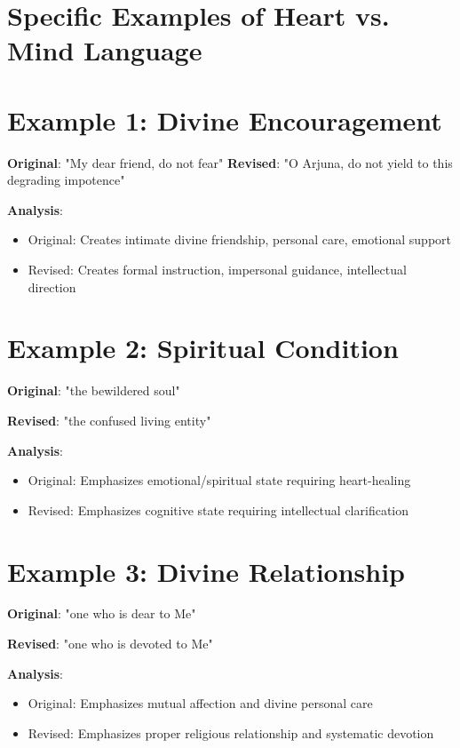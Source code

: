 \documentclass[11pt,twoside]{book}
\begin{document}
\section*{Specific Examples of Heart vs. Mind Language}
\label{sec:org4640902}

\section*{Example 1: Divine Encouragement}
\label{sec:org0e43ae0}
\textbf{\textbf{Original}}: "My dear friend, do not fear"
\textbf{\textbf{Revised}}: "O Arjuna, do not yield to this degrading impotence"

\textbf{\textbf{Analysis}}: 
\begin{itemize}
\item Original: Creates intimate divine friendship, personal care, emotional support
\item Revised: Creates formal instruction, impersonal guidance, intellectual direction
\end{itemize}
\section*{Example 2: Spiritual Condition}
\label{sec:orgf591511}
\textbf{\textbf{Original}}: "the bewildered soul"

\textbf{\textbf{Revised}}: "the confused living entity"

\textbf{\textbf{Analysis}}:
\begin{itemize}
\item Original: Emphasizes emotional/spiritual state requiring heart-healing
\item Revised: Emphasizes cognitive state requiring intellectual clarification
\end{itemize}
\section*{Example 3: Divine Relationship}
\label{sec:org0c02545}
\textbf{\textbf{Original}}: "one who is dear to Me"

\textbf{\textbf{Revised}}: "one who is devoted to Me"

\textbf{\textbf{Analysis}}:
\begin{itemize}
\item Original: Emphasizes mutual affection and divine personal care
\item Revised: Emphasizes proper religious relationship and systematic devotion
\end{itemize}
\end{document}
